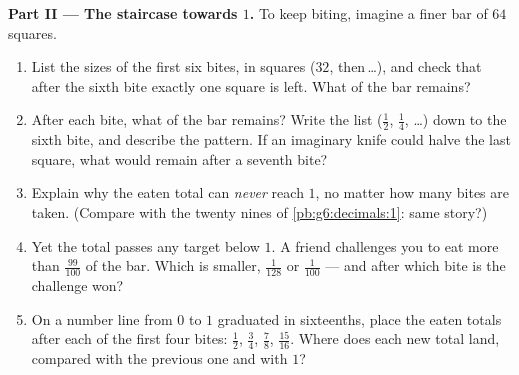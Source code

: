 \begin{problem}
\medskip
\noindent\textbf{Part II --- The staircase towards $1$.}
To keep biting, imagine a finer bar of $64$ squares.
\begin{enumerate}[resume]
  \item List the sizes of the first six bites, in squares
        ($32$, then\,\dots), and check that after the sixth bite
        exactly one square is left. What  of the bar
        remains?
  \item After each bite, what  of the bar remains? Write
        the list ($\frac12$, $\frac14$, \dots) down to the sixth
        bite, and describe the pattern. If an imaginary knife
        could halve  the last square, what would remain after
        a seventh bite?
  \item Explain why the eaten total can \emph{never} reach $1$,
        no matter how many bites are taken. (Compare with the
        twenty nines of \cref{pb:g6:decimals:1}: same story?)
  \item Yet the total passes any target below $1$. A friend
        challenges you to eat more than $\frac{99}{100}$ of the
        bar. Which is smaller, $\frac{1}{128}$ or
        $\frac{1}{100}$ --- and after which bite is the challenge
        won?
  \item On a number line from $0$ to $1$ graduated in sixteenths,
        place the eaten totals after each of the first four
        bites: $\frac12$, $\frac34$, $\frac78$, $\frac{15}{16}$.
        Where does each new total land, compared with the
        previous one and with $1$?
\end{enumerate}


\end{problem}
